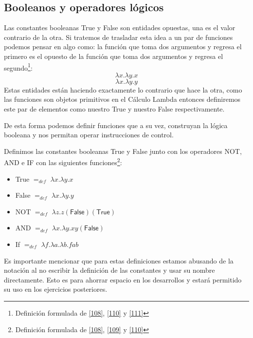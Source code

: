     \subsection{Booleanos y operadores lógicos}
    Las constantes booleanas \textsf{True} y \textsf{False} son entidades opuestas, una es el valor contrario de la otra. Si tratemos de trasladar esta idea a un par de funciones podemos pensar en algo como:
    la función que toma dos argumentos y regresa el primero es el opuesto de la función que toma dos argumentos y regresa el segundo\footnote{Definición formulada de \hyperlink{108}{[108]},  \hyperlink{110}{[110]} y  \hyperlink{111}{[111]}}:
    \[
        \lambda x.\lambda y.x
    \]
    \[
        \lambda x.\lambda y.y
    \]
    Estas entidades están haciendo exactamente lo contrario que hace la otra, como las funciones son objetos primitivos en el Cálculo Lambda entonces definiremos este par de elementos como nuestro \textsf{True} y nuestro \textsf{False} respectivamente.

    De esta forma podemos definir funciones que a su vez, construyan la lógica booleana y nos permitan operar instrucciones de control.
    \begin{definition} Definimos las constantes booleanas \textsf{True} y \textsf{False} junto con los operadores \textsf{NOT}, \textsf{AND} e \textsf{IF} con las siguientes funciones\footnote{Definición formulada de \hyperlink{108}{[108]},  \hyperlink{109}{[109]} y  \hyperlink{110}{[110]}}:\\

        \begin{itemize}
            \item \textsf{True}  $=_{def}$  $\lambda x.\lambda y.x$ 
            \item \textsf{False}  $=_{def}$   $\lambda x.\lambda y.y$ 
            \item\textsf{NOT}   $=_{def}$   $\lambda z. z  (\textsf{False}) (\textsf{True})$ 
            \item \textsf{AND}  $=_{def}$  $\lambda x.\lambda y. xy (\textsf{False})$ 
	     \item \textsf{If}      $=_{def}$ $\lambda f.\lambda a.\lambda b.fab $
        \end{itemize}
	  \bigskip
	Es importante mencionar que para estas definiciones estamos abusando de la notación al no escribir la definición de las constantes y usar su nombre directamente. Esto es para ahorrar espacio en los desarrollos y estará permitido su uso en los ejercicios posteriores.
    \end{definition}

